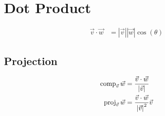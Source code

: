 \section{Dot Product}

  \begin{align}
    \vec{v} \cdot \vec{w} &= \left| \vec{v} \right| \left| \vec{w} \right| \cos\left( \theta \right)
  \end{align}

  \subsection{Projection}

    \begin{align}
      \operatorname{comp}_{\vec{v}} \vec{w} &= \frac{ \vec{v} \cdot \vec{w} }{ \left| \vec{v} \right| } \\
      \operatorname{proj}_{\vec{v}} \vec{w} &= \frac{ \vec{v} \cdot \vec{w} }{ \left| \vec{v} \right|^{2} } \vec{v}
    \end{align}